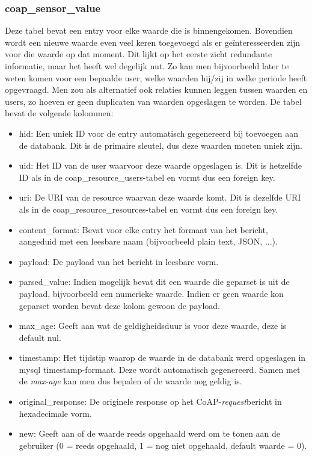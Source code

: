 \subsubsection{coap\_sensor\_value}
Deze tabel bevat een entry voor elke waarde die is binnengekomen. Bovendien wordt een nieuwe waarde even veel keren toegevoegd als er ge\"{i}nteresseerden zijn voor die waarde op dat moment. Dit lijkt op het eerste zicht redundante informatie, maar het heeft wel degelijk nut. Zo kan men bijvoorbeeld later te weten komen voor een bepaalde user, welke waarden hij/zij in welke periode heeft opgevraagd. Men zou als alternatief ook relaties kunnen leggen tussen waarden en users, zo hoeven er geen duplicaten van waarden opgeslagen te worden. De tabel bevat de volgende kolommen:
\begin{itemize}
\item hid: Een uniek ID voor de entry automatisch gegenereerd bij toevoegen aan de databank. Dit is de primaire sleutel, dus deze waarden moeten uniek zijn.
\item uid: Het ID van de user waarvoor deze waarde opgeslagen is. Dit is hetzelfde ID als in de coap\_resource\_users-tabel en vormt dus een foreign key.
\item uri: De URI van de resource waarvan deze waarde komt. Dit is dezelfde URI als in de coap\_resource\_resources-tabel en vormt dus een foreign key.
\item content\_format: Bevat voor elke entry het formaat van het bericht, aangeduid met een leesbare naam (bijvoorbeeld plain text, JSON, ...). 
\item payload: De payload van het bericht in leesbare vorm.
\item parsed\_value: Indien mogelijk bevat dit een waarde die geparset is uit de payload, bijvoorbeeld een numerieke waarde. Indien er geen waarde kon geparset worden bevat deze kolom gewoon de payload.
\item max\_age: Geeft aan wat de geldigheidsduur is voor deze waarde, deze is default nul.
\item timestamp: Het tijdstip waarop de waarde in de databank werd opgeslagen in mysql timestamp-formaat. Deze wordt automatisch gegenereerd. Samen met de \textit{max-age} kan men dus bepalen of de waarde nog geldig is.
\item original\_response: De originele response op het CoAP-\textit{request}bericht in hexadecimale vorm.
\item new: Geeft aan of de waarde reeds opgehaald werd om te tonen aan de gebruiker (0 = reeds opgehaald, 1 = nog niet opgehaald, default waarde = 0).
\end{itemize}

